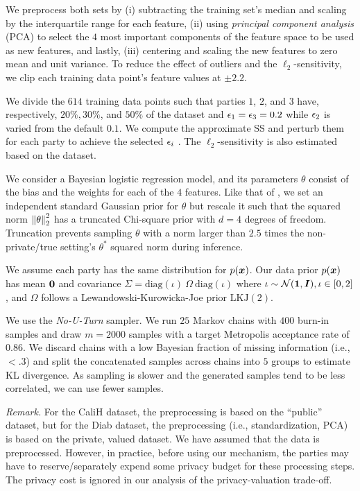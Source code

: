 \documentclass{article}
\theoremstyle{plain}
\theoremstyle{definition}
\theoremstyle{remark}
\begin{document}
We preprocess both sets by (i) subtracting the training set's median and scaling by the interquartile range for each feature, (ii) using \emph{principal component analysis} (PCA) to select the $4$ most important components of the feature space to be used as new features, and lastly, (iii) centering and scaling the new features to zero mean and unit variance. To reduce the effect of outliers and the $\ell_2$-sensitivity, we clip each training data point's feature values at $\pm 2.2$.

We divide the $614$ training data points such that parties $1$, $2$, and $3$ have, respectively, $20\%, 30\%$, and $50\%$ of the dataset and $\eps_1 = \eps_3 = 0.2$ while $\eps_2$ is varied from the default $0.1$.
We compute the approximate SS \cite{huggins2017pass} and perturb them for each party to achieve the selected $\eps_i$ \cite{kulkarni2021glm}. The $\ell_2$-sensitivity is also estimated based on the dataset.

We consider a Bayesian logistic regression model, and its parameters $\theta$ consist of the bias and the weights for each of the $4$ features. Like that of \cite{kulkarni2021glm}, we set an independent standard Gaussian prior for $\theta$ but rescale it such that the squared norm $\norm*{\theta}_2^2$ has a truncated Chi-square prior with $d=4$ degrees of freedom. Truncation prevents sampling $\theta$ with a norm larger than $2.5$ times the non-private/true setting's $\theta^*$ squared norm during inference.

We assume each party has the same distribution for $p(\vx)$.
Our data prior $p(\vx)$ has mean $\vzero$ and covariance $\Sigma = \text{diag}(\iota)\ \Omega\  \text{diag}(\iota) $
where $\iota \sim \mathcal{N}(\vone,\mI), \iota \in [0,2]$,  and $\Omega$ follows a Lewandowski-Kurowicka-Joe prior $\text{LKJ}(2)$. 

We use the \emph{No-U-Turn} \cite{hoffman2014no} sampler. We run $25$ Markov chains with $400$ burn-in samples and draw $m=2000$ samples with a target Metropolis acceptance rate of $0.86$. We discard chains with a low Bayesian fraction of missing information (i.e., $<.3$) and split the concatenated samples across chains into $5$ groups to estimate KL divergence.
As sampling is slower and the generated samples tend to be less correlated, we can use fewer samples.


\emph{Remark.} 
For the CaliH dataset, the preprocessing is based on the ``public'' dataset, but for the Diab dataset, the preprocessing (i.e., standardization, PCA) is based on the private, valued dataset. We have assumed that the data is preprocessed. However, in practice, before using our mechanism,  the parties may have to reserve/separately expend some privacy budget for these processing steps. The privacy cost is ignored in our analysis of the privacy-valuation trade-off. 
\end{document}

